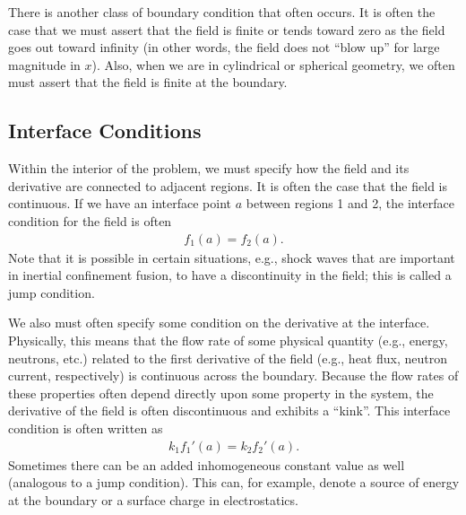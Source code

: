There is another class of boundary condition that often occurs. It is often the case that we must assert that the field is finite or tends toward zero as the field goes out toward infinity (in other words, the field does not ``blow up'' for large magnitude in $x$). Also, when we are in cylindrical or spherical geometry, we often must assert that the field is finite at the boundary.

\subsection{Interface Conditions}

Within the interior of the problem, we must specify how the field and its derivative are connected to adjacent regions. It is often the case that the field is continuous. If we have an interface point $a$ between regions 1 and 2, the interface condition for the field is often
\begin{align}
  f_1(a) = f_2(a).
\end{align}
Note that it is possible in certain situations, e.g., shock waves that are important in inertial confinement fusion, to have a discontinuity in the field; this is called a jump condition.

We also must often specify some condition on the derivative at the interface. Physically, this means that the flow rate of some physical quantity (e.g., energy, neutrons, etc.) related to the first derivative of the field (e.g., heat flux, neutron current, respectively) is continuous across the boundary. Because the flow rates of these properties often depend directly upon some property in the system, the derivative of the field is often discontinuous and exhibits a ``kink''. This interface condition is often written as
\begin{align}
  k_1 f_1'(a) = k_2 f_2'(a).
\end{align}
Sometimes there can be an added inhomogeneous constant value as well (analogous to a jump condition). This can, for example, denote a source of energy at the boundary or a surface charge in electrostatics.


